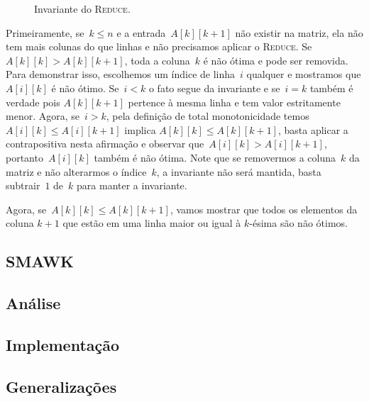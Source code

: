 \begin{figure}[h]
    \centering
    
    \caption{Invariante do \textsc{Reduce}.} \label{figure:Reduce1}
\end{figure}

Primeiramente, se~$k \leq n$ e a entrada~$A[k][k+1]$ não existir na matriz, ela não tem mais colunas do que linhas e não precisamos aplicar o \textsc{Reduce}. Se~$A[k][k] > A[k][k+1]$, toda a coluna~$k$ é não ótima e pode ser removida. Para demonstrar isso, escolhemos um índice de linha~$i$ qualquer e mostramos que $A[i][k]$ é não ótimo. Se~$i < k$ o fato segue da invariante e se~$i = k$ também é verdade pois $A[k][k+1]$ pertence à mesma linha e tem valor estritamente menor. Agora, se~$i > k$, pela definição de total monotonicidade temos~$A[i][k] \leq A[i][k+1]$ implica $A[k][k] \leq A[k][k+1]$, basta aplicar a contrapositiva nesta afirmação e observar que~$A[i][k] > A[i][k+1]$, portanto~$A[i][k]$ também é não ótima. Note que se removermos a coluna~$k$ da matriz e não alterarmos o índice~$k$, a invariante não será mantida, basta subtrair~$1$ de~$k$ para manter a invariante.

Agora, se~$A[k][k] \leq A[k][k+1]$, vamos mostrar que todos os elementos da coluna $k+1$ que estão em uma linha maior ou igual à $k$-ésima são não ótimos.


\subsection{SMAWK}

\subsection{Análise}

\subsection{Implementação}

\subsection{Generalizações} \label{SMAWK_Generalizacoes}
